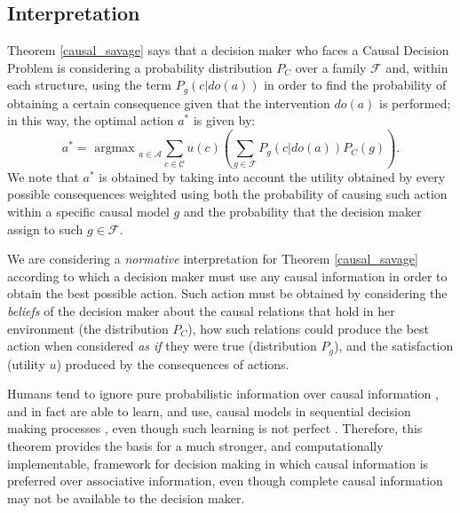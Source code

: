 \documentclass[review]{elsarticle}
\begin{document}
\subsection{Interpretation}
Theorem \ref{causal_savage} says that a decision maker who faces a Causal Decision Problem is considering a probability distribution $P_C$ over a family $\mathcal{F}$ and, within each structure, using the term $P_g(c|do(a))$ in order to find the probability of obtaining a certain consequence given that the intervention $do(a)$ is performed; in this way, the optimal action $a^\ast$ is given by:
\begin{equation}
a^\ast = \textrm{ argmax }_{a \in \mathcal{A}}  \sum_{c \in \mathcal{C}} u(c) \left( \sum_{g \in \mathcal{F}} P_g(c | do(a))P_C(g) \right). 
\end{equation}
We note that $a^\ast$ is obtained by taking into account the utility obtained by every possible consequences weighted using both the probability of causing such action within a specific causal model $g$ and the probability that the decision maker assign to such $g \in \mathcal{F}$.

We are considering a \textit{normative} interpretation for Theorem \ref{causal_savage} according to which a decision maker must use any causal information in order to obtain the best possible action. Such action must be obtained by considering the \textit{beliefs} of the decision maker about the causal relations that hold in her environment (the distribution $P_C$), how such relations could produce the best action when considered \textit{as if} they were true (distribution $P_g$), and the satisfaction (utility $u$) produced by the consequences of actions.

Humans tend to ignore pure probabilistic information over causal information \citep{tversky1980causal}, and in fact are able to learn, and use, causal models in sequential decision making processes \citep{lagnado2007beyond,sloman2006causal,nichols2007decision,meder2010observing,hagmayer2013repeated,wellen2012learning}, even though such learning is not perfect \citep{rottman2014reasoning}. Therefore, this theorem provides the basis for a much stronger, and computationally implementable, framework for decision making in which causal information is preferred over associative information, even though complete causal information may not be available to the decision maker.
\end{document}
